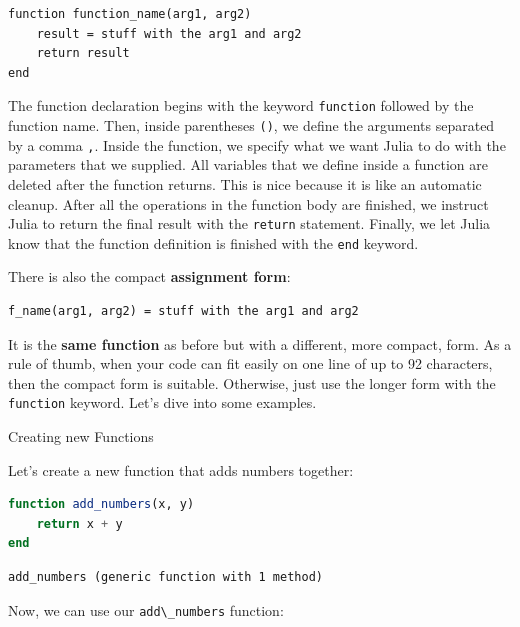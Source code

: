 \documentclass[
  notoc %
]{tufte-book}
\makeatletter
\newcommand{\passthrough}[1]{#1}
\renewcommand\subsubsection{%
\@startsection{subsubsection}{3}{\z@ }{-3.25ex\@plus -1ex \@minus -.2ex}{1.5ex \@plus .2ex}{\normalfont \normalsize \bfseries }
}
\makeatother
\begin{document}
\begin{lstlisting}
function function_name(arg1, arg2)
    result = stuff with the arg1 and arg2
    return result
end
\end{lstlisting}

The function declaration begins with the keyword
\passthrough{\lstinline!function!} followed by the function name. Then,
inside parentheses \passthrough{\lstinline!()!}, we define the arguments
separated by a comma \passthrough{\lstinline!,!}. Inside the function,
we specify what we want Julia to do with the parameters that we
supplied. All variables that we define inside a function are deleted
after the function returns. This is nice because it is like an automatic
cleanup. After all the operations in the function body are finished, we
instruct Julia to return the final result with the
\passthrough{\lstinline!return!} statement. Finally, we let Julia know
that the function definition is finished with the
\passthrough{\lstinline!end!} keyword.

There is also the compact \textbf{assignment form}:

\begin{lstlisting}
f_name(arg1, arg2) = stuff with the arg1 and arg2
\end{lstlisting}

It is the \textbf{same function} as before but with a different, more
compact, form. As a rule of thumb, when your code can fit easily on one
line of up to 92 characters, then the compact form is suitable.
Otherwise, just use the longer form with the
\passthrough{\lstinline!function!} keyword. Let's dive into some
examples.

\hypertarget{sec:function_example}{%
\subsubsection{Creating new Functions}\label{sec:function_example}}

Let's create a new function that adds numbers together:

\begin{lstlisting}[language=Julia]
function add_numbers(x, y)
    return x + y
end
\end{lstlisting}

\begin{lstlisting}[language=Output]
add_numbers (generic function with 1 method)
\end{lstlisting}

Now, we can use our \passthrough{\lstinline!add\_numbers!} function:
\end{document}
